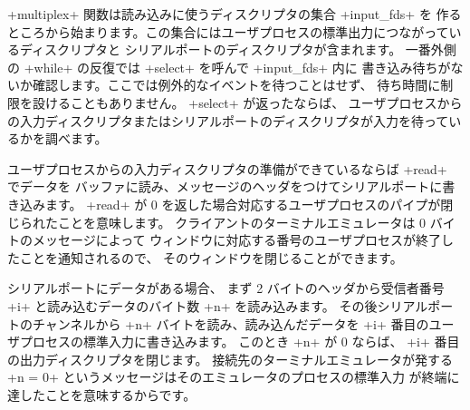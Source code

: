 \begin{example}
\ml+multiplex+ 関数は読み込みに使うディスクリプタの集合 \ml+input_fds+ を
作るところから始まります。この集合にはユーザプロセスの標準出力につながっているディスクリプタと
シリアルポートのディスクリプタが含まれます。
一番外側の \ml+while+ の反復では \ml+select+ を呼んで \ml+input_fds+ 内に
書き込み待ちがないか確認します。ここでは例外的なイベントを待つことはせず、
待ち時間に制限を設けることもありません。
\ml+select+ が返ったならば、
ユーザプロセスからの入力ディスクリプタまたはシリアルポートのディスクリプタが入力を待っているかを調べます。

ユーザプロセスからの入力ディスクリプタの準備ができているならば \ml+read+ でデータを
バッファに読み、メッセージのヘッダをつけてシリアルポートに書き込みます。
\ml+read+ が 0 を返した場合対応するユーザプロセスのパイプが閉じられたことを意味します。
クライアントのターミナルエミュレータは 0 バイトのメッセージによって
ウィンドウに対応する番号のユーザプロセスが終了したことを通知されるので、
そのウィンドウを閉じることができます。

シリアルポートにデータがある場合、
まず 2 バイトのヘッダから受信者番号 \ml+i+ と読み込むデータのバイト数 \ml+n+ を読み込みます。
その後シリアルポートのチャンネルから \ml+n+ バイトを読み、読み込んだデータを
\ml+i+ 番目のユーザプロセスの標準入力に書き込みます。
このとき \ml+n+ が 0 ならば、 \ml+i+ 番目の出力ディスクリプタを閉じます。
接続先のターミナルエミュレータが発する \ml+n = 0+ というメッセージはそのエミュレータのプロセスの標準入力
が終端に達したことを意味するからです。


\end{example}
